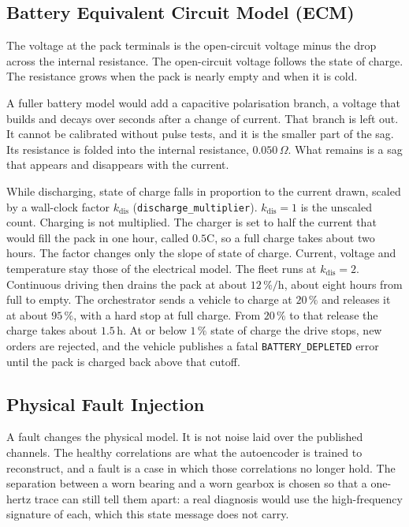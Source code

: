 \subsection{Battery Equivalent Circuit Model (ECM)}

The voltage at the pack terminals is the open-circuit voltage minus the drop across the internal resistance. The open-circuit voltage follows the state of charge. The resistance grows when the pack is nearly empty and when it is cold.

A fuller battery model would add a capacitive polarisation branch, a voltage that builds and decays over seconds after a change of current. That branch is left out. It cannot be calibrated without pulse tests, and it is the smaller part of the sag. Its resistance is folded into the internal resistance, $0.050\,\Omega$. What remains is a sag that appears and disappears with the current.

While discharging, state of charge falls in proportion to the current drawn, scaled by a wall-clock factor $k_{\mathrm{dis}}$ (\texttt{discharge\_multiplier}). $k_{\mathrm{dis}} = 1$ is the unscaled count. Charging is not multiplied. The charger is set to half the current that would fill the pack in one hour, called $0.5\mathrm{C}$, so a full charge takes about two hours. The factor changes only the slope of state of charge. Current, voltage and temperature stay those of the electrical model. The fleet runs at $k_{\mathrm{dis}} = 2$. Continuous driving then drains the pack at about $12\,\%/\mathrm{h}$, about eight hours from full to empty. The orchestrator sends a vehicle to charge at $20\,\%$ and releases it at about $95\,\%$, with a hard stop at full charge. From $20\,\%$ to that release the charge takes about $1.5\,\mathrm{h}$. At or below $1\,\%$ state of charge the drive stops, new orders are rejected, and the vehicle publishes a fatal \texttt{BATTERY\_DEPLETED} error until the pack is charged back above that cutoff.

\subsection{Physical Fault Injection}
\label{subsec:fault_injection}

A fault changes the physical model. It is not noise laid over the published channels. The healthy correlations are what the autoencoder is trained to reconstruct, and a fault is a case in which those correlations no longer hold. The separation between a worn bearing and a worn gearbox is chosen so that a one-hertz trace can still tell them apart: a real diagnosis would use the high-frequency signature of each, which this state message does not carry.

